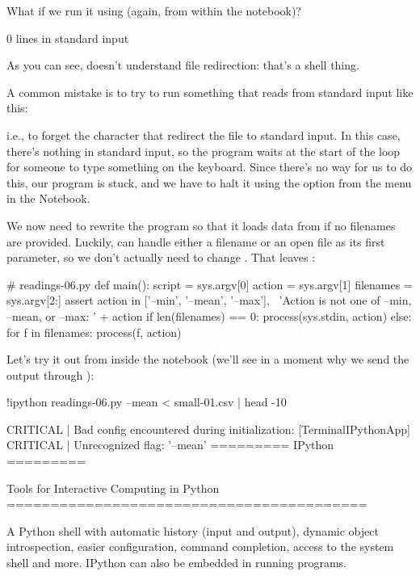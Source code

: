 What if we run it using  (again, from within the notebook)?

\begin{VerbIn}
\end{VerbIn}

\begin{VerbOut}
0 lines in standard input
\end{VerbOut}

As you can see,  doesn't understand file redirection:
that's a shell thing.

A common mistake is to try to run something that reads from standard
input like this:


i.e., to forget the \code{\textless{}} character that redirect the
file to standard input. In this case, there's nothing in standard input,
so the program waits at the start of the loop for someone to type
something on the keyboard. Since there's no way for us to do this, our
program is stuck, and we have to halt it using the 
option from the  menu in the Notebook.

We now need to rewrite the program so that it loads data from
 if no filenames are provided. Luckily,
 can handle either a filename or an open file as
its first parameter, so we don't actually need to change
. That leaves :

\begin{VerbIn}
# readings-06.py
def main():
    script = sys.argv[0]
    action = sys.argv[1]
    filenames = sys.argv[2:]
    assert action in ['--min', '--mean', '--max'], \
           'Action is not one of --min, --mean, or --max: ' + action
    if len(filenames) == 0:
        process(sys.stdin, action)
    else:
        for f in filenames:
            process(f, action)
\end{VerbIn}

Let's try it out from inside the notebook (we'll see in a moment why we send the output through
\code{head}):

\begin{VerbIn}
!ipython readings-06.py --mean < small-01.csv | head -10
\end{VerbIn}

\begin{VerbOut}
[TerminalIPythonApp] CRITICAL | Bad config encountered during initialization:
[TerminalIPythonApp] CRITICAL | Unrecognized flag: '--mean'
=========
 IPython
=========

Tools for Interactive Computing in Python
=========================================

    A Python shell with automatic history (input and output), dynamic object
    introspection, easier configuration, command completion, access to the
    system shell and more.  IPython can also be embedded in running programs.
\end{VerbOut}

